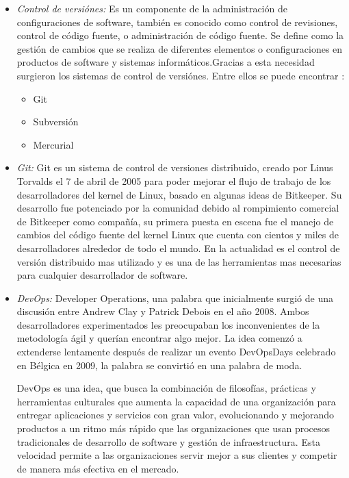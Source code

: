 \documentclass[letterpaper, 12pt, oneside]{article}
\begin{document}
\begin{itemize}
        \item \textit{Control de versiónes:} Es un componente de la administración de configuraciones de software, también es conocido como control de revisiones, control de código fuente, o administración de código fuente. Se define como la gestión de cambios que se realiza de diferentes elementos o configuraciones en productos de software y sistemas informáticos.Gracias a esta necesidad surgieron los sistemas de control de versiónes. Entre ellos se puede encontrar : 
        
        \begin{itemize}
            \item Git 
            \item Subversión 
            \item Mercurial
        \end{itemize}
        
        \item \textit{Git:} Git es un sistema de control de versiones distribuido, creado por Linus Torvalds el 7 de abril de 2005 para poder mejorar el flujo de trabajo de los desarrolladores del kernel de Linux, basado en algunas ideas de Bitkeeper. Su desarrollo fue potenciado por la comunidad debido al rompimiento comercial de Bitkeeper como compañía, su primera puesta en escena fue el manejo de cambios del código fuente del kernel Linux que cuenta con cientos y miles de desarrolladores alrededor de todo el mundo. En la actualidad es el control de versión distribuido mas utilizado y es una de las herramientas mas necesarias para cualquier desarrollador de software. 
        
        \item \textit{DevOps:} Developer Operations, una palabra que inicialmente surgió de una discusión entre Andrew Clay y Patrick Debois en el año 2008. Ambos desarrolladores experimentados les preocupaban los inconvenientes de la metodología ágil y querían encontrar algo mejor. La idea comenzó a extenderse lentamente después de realizar un evento DevOpsDays celebrado en Bélgica en 2009, la palabra se convirtió en una palabra de moda. 
        
        DevOps es una idea, que busca la combinación de filosofías, prácticas y herramientas culturales que aumenta la capacidad de una organización para entregar aplicaciones y servicios con gran valor,  evolucionando y mejorando productos a un ritmo más rápido que las organizaciones que usan procesos tradicionales de desarrollo de software y gestión de infraestructura. Esta velocidad permite a las organizaciones servir mejor a sus clientes y competir de manera más efectiva en el mercado.\cite{devops2}
        

\end{itemize}
\end{document}
